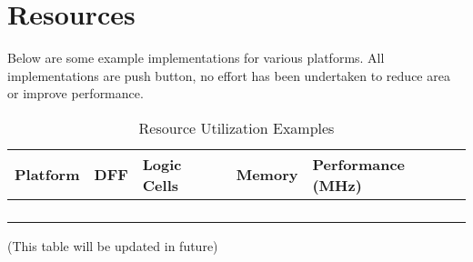 \chapter{Resources}\label{resources}

Below are some example implementations for various platforms. All implementations are push button, no effort has been undertaken to reduce area or improve performance.

\begin{longtable}[]{@{}lllll@{}}
\toprule
Platform & DFF & Logic Cells & Memory & Performance (MHz)\tabularnewline
\midrule
\endhead
& & & &\tabularnewline
& & & &\tabularnewline
& & & &\tabularnewline
\bottomrule
\caption{Resource Utilization Examples}
\end{longtable}

(This table will be updated in future)